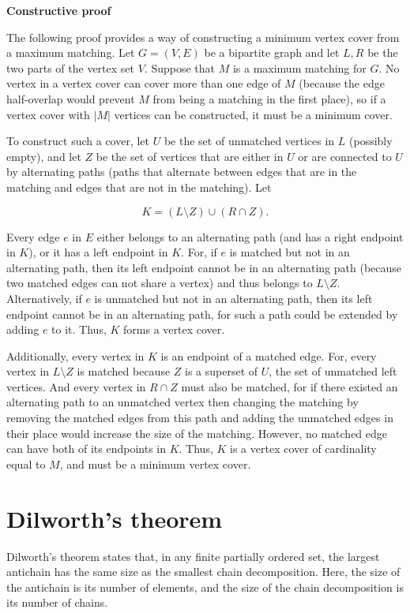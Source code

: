 \documentclass[11pt]{article}
\begin{document}
\begin{multicols}{3}
\textbf{Constructive proof}

The following proof provides a way of constructing a minimum vertex cover from a maximum matching. Let $G=(V,E)$ be a bipartite graph and let $L,R$ be the two parts of the vertex set $V$. Suppose that $M$ is a maximum matching for $G$. No vertex in a vertex cover can cover more than one edge of $M$ (because the edge half-overlap would prevent $M$ from being a matching in the first place), so if a vertex cover with $|M|$ vertices can be constructed, it must be a minimum cover.

To construct such a cover, let $U$ be the set of unmatched vertices in $L$ (possibly empty), and let $Z$ be the set of vertices that are either in $U$ or are connected to $U$ by alternating paths (paths that alternate between edges that are in the matching and edges that are not in the matching). Let

$$K=(L\setminus Z)\cup (R\cap Z).$$

Every edge $e$ in $E$ either belongs to an alternating path (and has a right endpoint in $K$), or it has a left endpoint in $K$. For, if $e$ is matched but not in an alternating path, then its left endpoint cannot be in an alternating path (because two matched edges can not share a vertex) and thus belongs to $L\setminus Z$. Alternatively, if $e$ is unmatched but not in an alternating path, then its left endpoint cannot be in an alternating path, for such a path could be extended by adding $e$ to it. Thus, $K$ forms a vertex cover.

Additionally, every vertex in $K$ is an endpoint of a matched edge. For, every vertex in $L\setminus Z$ is matched because $Z$ is a superset of $U$, the set of unmatched left vertices. And every vertex in $R\cap Z$ must also be matched, for if there existed an alternating path to an unmatched vertex then changing the matching by removing the matched edges from this path and adding the unmatched edges in their place would increase the size of the matching. However, no matched edge can have both of its endpoints in $K$. Thus, $K$ is a vertex cover of cardinality equal to $M$, and must be a minimum vertex cover.

\section{Dilworth's theorem}

Dilworth's theorem states that, in any finite partially ordered set, the largest antichain has the same size as the smallest chain decomposition. Here, the size of the antichain is its number of elements, and the size of the chain decomposition is its number of chains.


\end{multicols}
\end{document}

